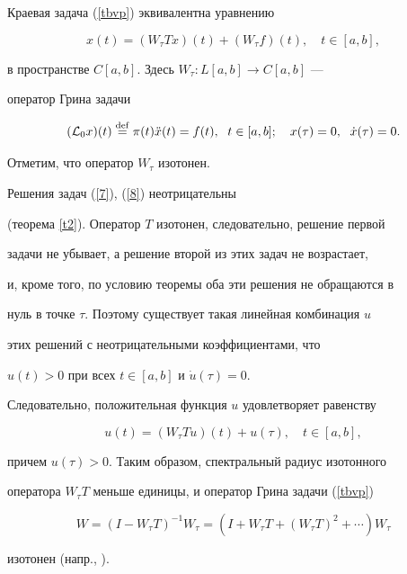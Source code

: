 \begin{pf}


Краевая задача (\ref{tbvp}) эквивалентна уравнению


$$


x(t)=(W_\tau Tx)(t)+(W_\tau f)(t),\quad


t\in[a,b],


$$


в пространстве $C[a,b]$. Здесь $W_\tau:L[a,b]\to C[a,b]$ ---


оператор Грина задачи


$$


(\L_0x)(t)\df\pi(t) \Ddot x(t)=f(t),\ \;


t\in[a,b];\quad x(\tau)=0,\ \; \Dot x(\tau)=0.


$$


Отметим, что оператор $W_\tau$ изотонен.





Решения задач (\ref{7}), (\ref{8}) неотрицательны


(теорема \ref{t2}). Оператор $T$ изотонен, следовательно, решение первой


задачи не убывает, а решение второй из этих задач не возрастает,


и, кроме того, по условию теоремы оба эти решения не обращаются в


нуль в точке $\tau$. Поэтому существует такая линейная комбинация $u$


этих решений с неотрицательными коэффициентами, что


$u(t)>0$ при всех $t\in[a,b]$ и $\Dot u(\tau)=0$.


Следовательно, положительная функция $u$ удовлетворяет равенству


$$


u(t)=(W_\tau Tu)(t)+u(\tau),\quad t\in[a,b],


$$


причем $u(\tau)>0$. Таким образом, спектральный радиус изотонного


оператора $W_\tau T$ меньше единицы, и оператор Грина задачи (\ref{tbvp})


$$


W=(I-W_\tau T)^{-1}W_\tau=(I+W_\tau T+(W_\tau


T)^2+\dotsb)W_\tau


$$


изотонен (напр., \cite{AR}).


\end{pf}





